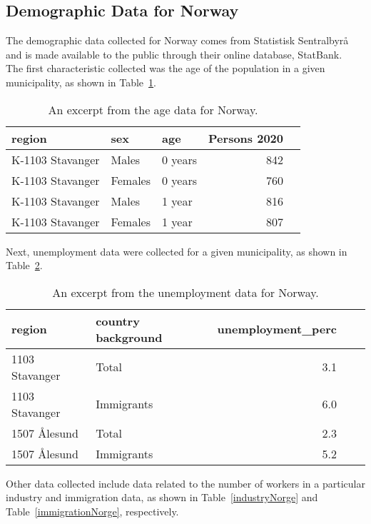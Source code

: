 \subsection*{Demographic Data for Norway}
The demographic data collected for Norway comes from Statistisk Sentralbyrå and is made available to the public through their online database, StatBank\cite{ssb}. \\
The first characteristic collected was the age of the population in a given municipality, as shown in Table~\ref{ageNorge}.
\begin{table}[H] 
\caption{An excerpt from the age data for Norway.\label{ageNorge}}
\begin{tabular}{l l l r r}
\toprule
\textbf{region}	& \textbf{sex}	& \textbf{age}	& \textbf{Persons 2020}\\
\midrule
K-1103 Stavanger & Males & 0 years & 842 \\
K-1103 Stavanger & Females & 0 years & 760 \\
K-1103 Stavanger & Males & 1 year & 816 \\
K-1103 Stavanger & Females & 1 year & 807 \\
\bottomrule
\end{tabular}
\end{table}
Next, unemployment data were collected for a given municipality, as shown in Table~\ref{unemploymentNorge}.
\begin{table}[H] 
\caption{An excerpt from the unemployment data for Norway.\label{unemploymentNorge}}
\begin{tabular}{l l r r r}
\toprule
\textbf{region}	& \textbf{country background}	& \textbf{unemployment\_perc}\\
\midrule
1103 Stavanger & Total & 3.1  \\
1103 Stavanger & Immigrants & 6.0  \\
1507 Ålesund & Total & 2.3  \\
1507 Ålesund & Immigrants & 5.2  \\
\bottomrule
\end{tabular}
\end{table}
Other data collected include data related to the number of workers in a particular industry and immigration data, as shown in Table~\ref{industryNorge} and Table~\ref{immigrationNorge}, respectively.
